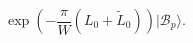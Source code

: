 \begin{equation}\label{eq:ClosedStringVersion}
  \exp\left(-\frac{\pi}{W}(L_0+\tilde{L}_0)\right) |\mathcal{B}_p \rangle.
\end{equation}

